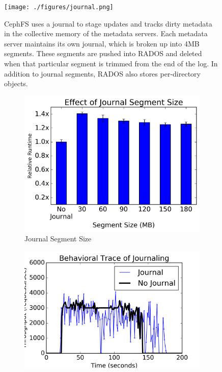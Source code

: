 \begin{figure}[tb] \centering
\texttt{[image: ./figures/journal.png]} 
\caption{CephFS uses a journal to stage updates and tracks dirty metadata in
the collective memory of the metadata servers. Each metadata server maintains its own journal, which is
broken up into 4MB segments. These segments are pushed into RADOS and deleted
when that particular segment is trimmed from the end of the log. In addition to
journal segments, RADOS also stores per-directory objects. \label{fig:journal}}
\end{figure}
\begin{figure}[t]
  \centering
  \begin{subfigure}[b]{.3\linewidth}
      \centering
      \includegraphics[width=1.0\linewidth]{graphs/slowdown-journal.png}
      \caption{Journal Segment Size} \label{fig:slowdown-journal-a}
  \end{subfigure}
  \begin{subfigure}[b]{.3\linewidth}
      \centering
      \includegraphics[width=1.0\linewidth]{graphs/behavior-journal.png}

\end{subfigure}
\end{figure}
